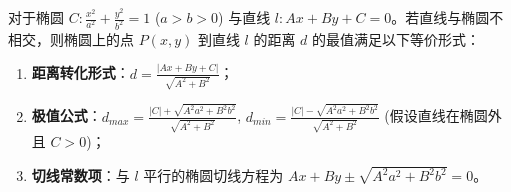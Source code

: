 \begin{statementbox}
对于椭圆 $C: \frac{x^2}{a^2} + \frac{y^2}{b^2} = 1$ ($a>b>0$) 与直线 $l: Ax + By + C = 0$。若直线与椭圆不相交，则椭圆上的点 $P(x, y)$ 到直线 $l$ 的距离 $d$ 的最值满足以下等价形式：
\begin{enumerate}
    \item \textbf{距离转化形式}：$d = \frac{|Ax + By + C|}{\sqrt{A^2 + B^2}}$；
    \item \textbf{极值公式}：$d_{max} = \frac{|C| + \sqrt{A^2a^2 + B^2b^2}}{\sqrt{A^2 + B^2}}$, $d_{min} = \frac{|C| - \sqrt{A^2a^2 + B^2b^2}}{\sqrt{A^2 + B^2}}$ (假设直线在椭圆外且 $C > 0$)；
    \item \textbf{切线常数项}：与 $l$ 平行的椭圆切线方程为 $Ax + By \pm \sqrt{A^2a^2 + B^2b^2} = 0$。
\end{enumerate}
\end{statementbox}